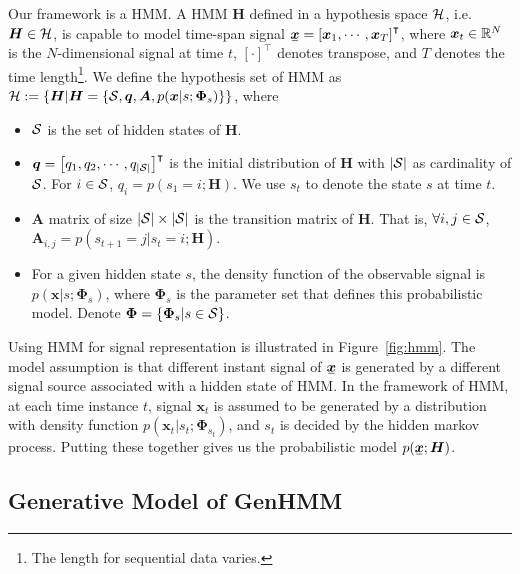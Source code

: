 \documentclass{ecai}
\newcommand{\ubar}[1]{\mkern2mu\underline{\mkern-2mu #1\mkern-2mu}\mkern2mu}
\newcommand{\ubm}[1]{\ubar{\bm{#1}}}
\begin{document}
Our framework is a HMM. A HMM $\bm{H}$ defined in a hypothesis space $\mathcal{H}$, i.e. $\bm{H} \in \mathcal{H}$, is capable to model time-span signal $\ubar{\bm{x}} = \left[ \bm{x}_1, \cdots, \bm{x}_T\right]^{\intercal}$, where $\bm{x}_t\in \mathbb{R}^{N}$ is the $N$-dimensional signal at time $t$, $[\cdot]^{\intercal}$ denotes transpose, and $T$ denotes the time length\footnote{The length for  sequential data varies.}. We define the hypothesis set of HMM as $\mathcal{H} := \{\bm{H} | \bm{H}=\{\mathcal{S}, \bm{q}, \bm{A}, p(\bm{x}|{s}; \bm{\Phi}_{s})\}\}$, where
\begin{itemize}
\item $\mathcal{S}$ is the set of hidden states of $\bm{H}$.
\item $\bm{q} = \left[ q_1, q_2, \cdots, q_{|\mathcal{S}|}\right]^\intercal$ is the initial distribution of $\bm{H}$ with $|\mathcal{S}|$ as cardinality of $\mathcal{S}$. For $i \in \mathcal{S}$, $q_i = p(s_{1}=i;\bm{H})$. We use $s_t$ to denote the state $s$ at time $t$.
\item $\bm{A}$ matrix of size $|\mathcal{S}| \times |\mathcal{S}|$ is the transition matrix of $\bm{H}$. That is, $\forall i, j \in \mathcal{S}$,  $\bm{A}_{i,j} = p(s_{t+1}=j|s_{t}=i; \bm{H})$.
\item For a given hidden state $s$, the density function of the observable signal is $p({\bm{x}}|{s};\bm{\Phi}_{s})$, where $\bm{\Phi}_{s}$ is the parameter set that defines this probabilistic model. Denote $\bm{\Phi} = \left\{ \bm{\Phi}_{s}| s \in \mathcal{S} \right\}$.
\end{itemize}


Using HMM for signal representation is illustrated in Figure~\ref{fig:hmm}. The model assumption is that different instant signal of $\ubar{\bm{x}}$ is generated by a different signal source associated with a hidden state of HMM.
In the framework of HMM, at each time instance $t$, signal $\bm{x}_t$ is assumed to be generated by a distribution with density function $p(\bm{x}_t| s_t; \bm{\Phi}_{s_t})$, and $s_t$ is decided by the hidden markov process. Putting these together gives us the probabilistic model $p(\ubm{x};\bm{H})$.

\subsection{Generative Model of GenHMM}
\end{document}
